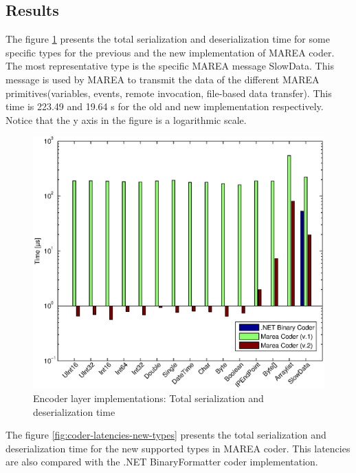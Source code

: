 \subsection{Results}\label{SS:Encoding-Layer-Results}

The figure \ref{fig:coder-latencies} presents the total serialization and deserialization time for some specific types for the previous and the new implementation of MAREA coder. The most representative type is the specific MAREA message SlowData. This message is used by MAREA to transmit the data of the different MAREA primitives(variables, events, remote invocation, file-based data transfer). This time is 223.49 and 19.64 \textmu s for the old and new implementation respectively. Notice that the y axis in the figure is a logarithmic scale.

\begin{figure}[H]\begin{center}
 \centering
  \captionsetup{justification=centering}
  \includegraphics[scale=0.6]{pictures/network/LatencyCoder}
  \caption{Encoder layer implementations: Total serialization and deserialization time\label{fig:coder-latencies}}
\end{center}\end{figure}

The figure \ref{fig:coder-latencies-new-types} presents the total serialization and deserialization time for the new supported types in MAREA coder. This latencies are also compared with the .NET BinaryFormatter coder implementation. 

